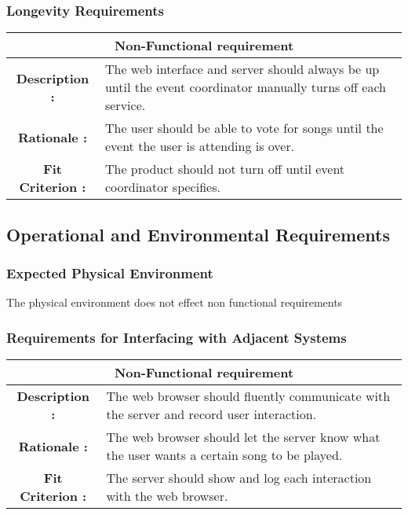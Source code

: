 \documentclass[12pt, titlepage]{article}
\begin{document}
\subsubsection{Longevity Requirements}
\begin{center}
\begin{table}[H]
\begin{tabularx}{\textwidth}{| c X |}
\hline
\multicolumn{2}{|c|}{\textbf{Non-Functional requirement}}\\
\hline 
\textbf{Description : } &The web interface and server should always be up until the event coordinator manually turns off each service.\\ 
\hline 
\textbf{Rationale : } & The user should be able to vote for songs until the event the user is attending is over. \\
\hline
\textbf{Fit Criterion : } & The product should not turn off until event coordinator specifies. \\
\hline
\end{tabularx}
\end{table}
\end{center}

\subsection{Operational and Environmental Requirements}
\subsubsection{Expected Physical Environment}
The physical environment does not effect non functional requirements
\subsubsection{Requirements for Interfacing with Adjacent Systems}
\begin{center}
\begin{table}[H]
\begin{tabularx}{\textwidth}{| c X |}
\hline
\multicolumn{2}{|c|}{\textbf{Non-Functional requirement}}\\
\hline 
\textbf{Description : } &The web browser should fluently communicate with the server and record user interaction.\\ 
\hline 
\textbf{Rationale : } & The web browser should let the server know what the user wants a certain song to be played. \\
\hline
\textbf{Fit Criterion : } & The server should show and log each interaction with the web browser. \\
\hline
\end{tabularx}
\end{table}
\end{center}
\end{document}
